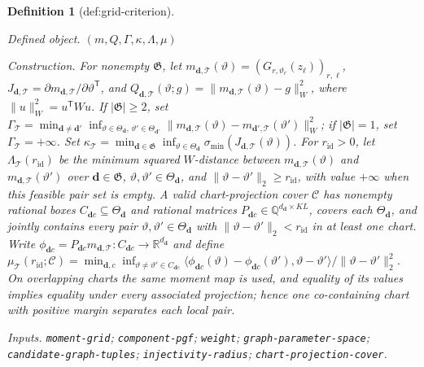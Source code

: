 \documentclass{article}
\newtheorem{definition}{Definition}
\begin{document}
\begin{definition}[def:grid-criterion]\label{def:grid-criterion}
\par\smallskip\noindent\emph{Defined object.} \((m,Q,\Gamma,\kappa,\Lambda,\mu)\)
\par\smallskip\noindent\emph{Construction.} For nonempty \(\mathfrak G\), let \(m_{\boldsymbol d,\mathcal T}(\vartheta)=(G_{r,\vartheta_r}(z_\ell))_{r,\ell}\), \(J_{\boldsymbol d,\mathcal T}=\partial m_{\boldsymbol d,\mathcal T}/\partial\vartheta^{\mathsf T}\), and \(Q_{\boldsymbol d,\mathcal T}(\vartheta;g)=\lVert m_{\boldsymbol d,\mathcal T}(\vartheta)-g\rVert_W^2\), where \(\lVert u\rVert_W^2=u^{\mathsf T}Wu\). If \(|\mathfrak G|\geq2\), set \(\Gamma_{\mathcal T}=\min_{\boldsymbol d\neq\boldsymbol d'}\inf_{\vartheta\in\Theta_{\boldsymbol d},\,\vartheta'\in\Theta_{\boldsymbol d'}}\lVert m_{\boldsymbol d,\mathcal T}(\vartheta)-m_{\boldsymbol d',\mathcal T}(\vartheta')\rVert_W^2\); if \(|\mathfrak G|=1\), set \(\Gamma_{\mathcal T}=+\infty\). Set \(\kappa_{\mathcal T}=\min_{\boldsymbol d\in\mathfrak G}\inf_{\vartheta\in\Theta_{\boldsymbol d}}\sigma_{\min}(J_{\boldsymbol d,\mathcal T}(\vartheta))\). For \(r_{\mathrm{id}}>0\), let \(\Lambda_{\mathcal T}(r_{\mathrm{id}})\) be the minimum squared \(W\)-distance between \(m_{\boldsymbol d,\mathcal T}(\vartheta)\) and \(m_{\boldsymbol d,\mathcal T}(\vartheta')\) over \(\boldsymbol d\in\mathfrak G\), \(\vartheta,\vartheta'\in\Theta_{\boldsymbol d}\), and \(\lVert\vartheta-\vartheta'\rVert_2\geq r_{\mathrm{id}}\), with value \(+\infty\) when this feasible pair set is empty. A valid chart-projection cover \(\mathscr C\) has nonempty rational boxes \(C_{\boldsymbol d c}\subseteq\Theta_{\boldsymbol d}\) and rational matrices \(P_{\boldsymbol d c}\in\mathbb Q^{d_{\boldsymbol d}\times KL}\), covers each \(\Theta_{\boldsymbol d}\), and jointly contains every pair \(\vartheta,\vartheta'\in\Theta_{\boldsymbol d}\) with \(\lVert\vartheta-\vartheta'\rVert_2<r_{\mathrm{id}}\) in at least one chart. Write \(\phi_{\boldsymbol d c}=P_{\boldsymbol d c}m_{\boldsymbol d,\mathcal T}:C_{\boldsymbol d c}\to\mathbb R^{d_{\boldsymbol d}}\) and define \(\mu_{\mathcal T}(r_{\mathrm{id}};\mathscr C)=\min_{\boldsymbol d,c}\inf_{\vartheta\neq\vartheta'\in C_{\boldsymbol d c}}\langle\phi_{\boldsymbol d c}(\vartheta)-\phi_{\boldsymbol d c}(\vartheta'),\vartheta-\vartheta'\rangle/\lVert\vartheta-\vartheta'\rVert_2^2\). On overlapping charts the same moment map is used, and equality of its values implies equality under every associated projection; hence one co-containing chart with positive margin separates each local pair.
\par\smallskip\noindent\emph{Inputs.} \texttt{moment-\allowbreak{}grid}; \texttt{component-\allowbreak{}pgf}; \texttt{weight}; \texttt{graph-\allowbreak{}parameter-\allowbreak{}space}; \texttt{candidate-\allowbreak{}graph-\allowbreak{}tuples}; \texttt{injectivity-\allowbreak{}radius}; \texttt{chart-\allowbreak{}projection-\allowbreak{}cover}.
\end{definition}
\end{document}
